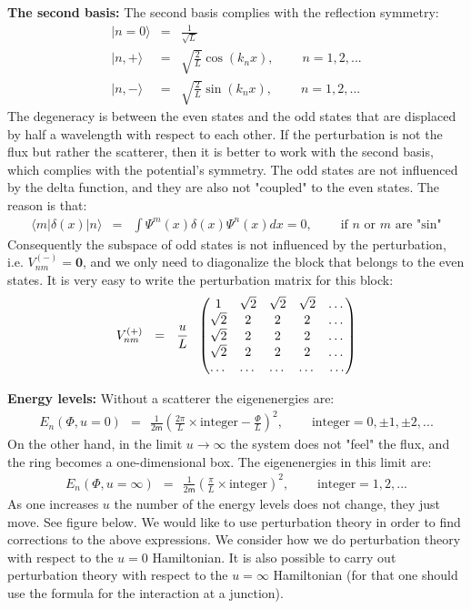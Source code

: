 \documentclass[onecolumn,fleqn]{revtex4}
\newcommand{\mass}{\mathsf{m}}
\newcommand{\amatrix}[1]{\begin{matrix} #1 \end{matrix}}
\newcommand{\beq}{\begin{eqnarray}}
\newcommand{\eeq}{\end{eqnarray}}
\begin{document}
 
{\bf The second basis:} 
The second basis complies with the reflection symmetry:
\beq
|n=0\rangle &=& \frac{1}{\sqrt{L}}
\\ \nonumber
| n, + \rangle &=& \sqrt{\frac{2}{L}} \cos(k_n x), \ \ \ \ \ \ \ \ \ \ n=1,2,...
\\ \nonumber
| n, - \rangle &=& \sqrt{\frac{2}{L}} \sin(k_n x), \ \ \ \ \ \ \ \ \ \ n=1,2,...
\eeq
The degeneracy is between the even states 
and the odd states that are displaced by 
half a wavelength with respect to each other. 
If the perturbation is not the flux but 
rather the scatterer, then it is better 
to work with the second basis, which complies 
with the potential's symmetry. The odd states 
are not influenced by the delta function, 
and they are also not "coupled" to the even states. The reason is that:
\beq
\langle m |\delta(x)|n \rangle &=& \int\Psi^m(x)\delta(x)\Psi^n(x)dx=0, 
\ \ \ \ \ \ \ \ \ \ \mbox{if $n$ or $m$ are "sin"}
\eeq
Consequently the subspace of odd states 
is not influenced by the perturbation,
i.e.  ${V_{nm}^{(-)}= \bm{0}}$, 
and we only need to diagonalize 
the block that belongs to the even states. 
It is very easy to write the perturbation 
matrix for this block:
\beq
V_{nm}^{(+)} \ \ = \ \ \frac{u}{L} \ \  
\left( 
\amatrix{
1 & \sqrt{2} & \sqrt{2} & \sqrt{2} & \dots \cr 
\sqrt{2} & 2 & 2 & 2 & \dots \cr 
\sqrt{2} & 2 &2 &2 & \dots \cr 
\sqrt{2} & 2 & 2 & 2 & \dots \cr 
\dots & \dots & \dots & \dots & \dots } 
\right) 
\eeq



{\bf Energy levels:} 
Without a scatterer the eigenenergies are:
\beq
E_n(\Phi, u{=}0)
\ \ = \ \ \frac{1}{2\mass}
\left(\frac{2\pi}{L}\times \mbox{integer}-\frac{\Phi}{L}\right)^2,
\ \ \ \ \ \ \ \ \ \ \mbox{integer}=0,\pm1,\pm2,...
\eeq
On the other hand, in the limit ${u\rightarrow\infty}$ 
the system does not "feel" the flux, and the ring becomes 
a one-dimensional box. The eigenenergies in this limit are:
\beq
E_n(\Phi, u{=}\infty) 
\ \ = \ \ \frac{1}{2\mass}\left(\frac{\pi}{L} \times \mbox{integer}\right)^2,
\ \ \ \ \ \ \ \ \ \ \mbox{integer}=1,2,...
\eeq
As one increases ${u}$ the number of the energy 
levels does not change, they just move. See figure below. 
We would like to use perturbation theory in order 
to find corrections to the above expressions. 
We consider how we do perturbation theory with respect 
to the  ${u{=}0}$ Hamiltonian. It is also possible 
to carry out perturbation theory with respect 
to the  ${u{=}\infty}$ Hamiltonian (for that one 
should use the formula for the interaction at a junction). 
\end{document}

